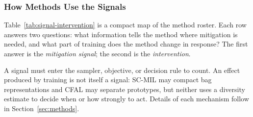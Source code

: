 \documentclass[11pt]{article}
\begin{document}
\subsubsection{How Methods Use the Signals}
Table~\ref{tab:signal-intervention} is a compact map of the method roster. Each row answers two questions: what information tells the method where mitigation is needed, and what part of training does the method change in response? The first answer is the \emph{mitigation signal}; the second is the \emph{intervention}.

A signal must enter the sampler, objective, or decision rule to count. An effect produced by training is not itself a signal: SC-MIL may compact bag representations and CFAL may separate prototypes, but neither uses a diversity estimate to decide when or how strongly to act. Details of each mechanism follow in Section~\ref{sec:methods}.
\end{document}

